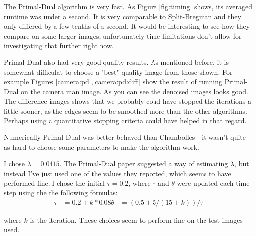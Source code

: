 \documentclass[11pt]{article}
\begin{document}
The Primal-Dual algorithm is very fast.
As Figure \ref{fig:timing} shows, its averaged runtime was under a second.
It is very comparable to Split-Bregman and they only differed by a few tenths of a second.
It would be interesting to see how they compare on some larger images, unfortunately time limitations don't allow for investigating that further right now.

Primal-Dual also had very good quality results.
As mentioned before, it is somewhat difficulat to choose a "best" quality image from those shown.
For example Figures \ref{camera:pd},\ref{camera:pd:diff} show the result of running Primal-Dual on the camera man image.
As you can see the denoised images looks good.
The difference images shows that we probably coud have stopped the iterations a little sooner, as the edges seem to be smoothed more than the other algorithms.
Perhaps using a quantitative stopping criteria could have helped in that regard.

Numerically Primal-Dual was better behaved than Chambolles - it wasn't quite as hard to choose some parameters to make the algorithm work.

I chose $\lambda=0.0415$.  
The Primal-Dual paper suggested a way of estimating $\lambda$, but instead I've just used one of the values they reported, which seems to have performed fine.
I chose the initial $\tau=0.2$, where $\tau$ and $\theta$ were updated each time step using the the following formulas:
\begin{align*}
\tau &= 0.2 + k*0.08
\theta &= (0.5 + 5/(15+k))/\tau
\end{align*}

where $k$ is the iteration.
These choices seem to perform fine on the test images used.
\end{document}
